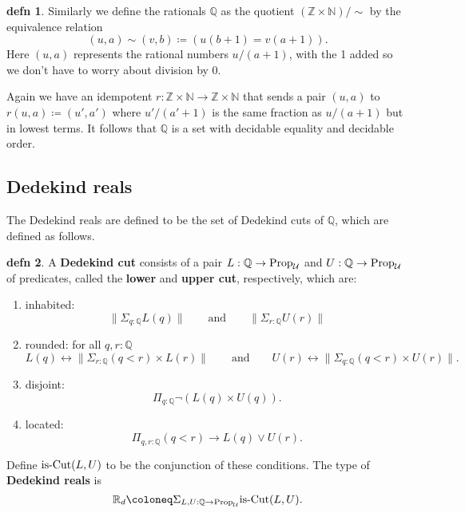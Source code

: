 \documentclass{amsart}
\theoremstyle{theorem}
\theoremstyle{definition}
\newtheorem*{defn}{defn}
\theoremstyle{remark}
\newcommand{\0}{\mathbbe{0}}
\newcommand{\1}{\mathbbe{1}}
\newcommand{\2}{\mathbbe{2}}
\newcommand{\3}{\mathbbe{3}}
\newcommand{\4}{\mathbbe{4}}
\newcommand{\NN}{\mathbb{N}}
\newcommand{\QQ}{\mathbb{Q}}
\newcommand{\RR}{\mathbb{R}}
\newcommand{\ZZ}{\mathbb{Z}}
\newcommand{\type}[1]{{\textup{#1}}}
\newcommand{\UU}{{\mathcal{U}}}
\newcommand{\is}[1]{\type{is-{#1}}}
\newcommand{\Prop}{\type{Prop}_{\UU}}
\newcommand{\mere}[1]{\|{#1}\|}
\begin{document}
\begin{defn} Similarly we define the rationals $\QQ$ as the quotient $(\ZZ \times \NN)/\sim$ by the equivalence relation
\[ (u,a) \sim (v,b) \coloneq (u(b+1) = v(a+1)).\]
Here $(u,a)$ represents the rational numbers $u/(a+1)$, with the 1 added so we don't have to worry about division by 0. 
\end{defn}

Again we have an idempotent $r \colon \ZZ \times \NN \to \ZZ \times \NN$ that sends a pair $(u,a)$ to $r(u,a) \coloneq (u',a')$ where $u'/(a'+1)$ is the same fraction as $u/(a+1)$ but in lowest terms. It follows that $\QQ$ is a set with decidable equality and decidable order. 

\subsection*{Dedekind reals}
 
 The Dedekind reals are defined to be the set of Dedekind cuts of $\QQ$, which are defined as follows.

\begin{defn} A \textbf{Dedekind cut} consists of a pair $L : \QQ \to \Prop$ and $U : \QQ \to \Prop$ of predicates,  called the \textbf{lower} and \textbf{upper cut}, respectively, which are:
\begin{enumerate}
\item inhabited: 
\[ \mere{ \Sigma_{q:\QQ}L(q)} \qquad \text{and} \qquad \mere{\Sigma_{r:\QQ}U(r)}\]
\item rounded: for all $q, r:\QQ$
\[ L(q) \leftrightarrow \mere{\Sigma_{r:\QQ} (q < r) \times L(r)} \qquad \text{and}\qquad U(r) \leftrightarrow \mere{\Sigma_{q:\QQ} (q<r) \times U(r)}.\]
\item disjoint: \[\Pi_{q: \QQ} \neg (L(q) \times U(q)).\]
\item located: \[\Pi_{q,r: \QQ} (q <r) \to L(q) \vee U(r).\]
\end{enumerate}
\end{defn}

Define $\is{Cut}(L,U)$ to be the conjunction of these conditions. The type of \textbf{Dedekind reals} is 
\[ \RR_d \coloneq \Sigma_{L,U : \QQ \to \Prop} \is{Cut}(L,U).\]
\end{document}
